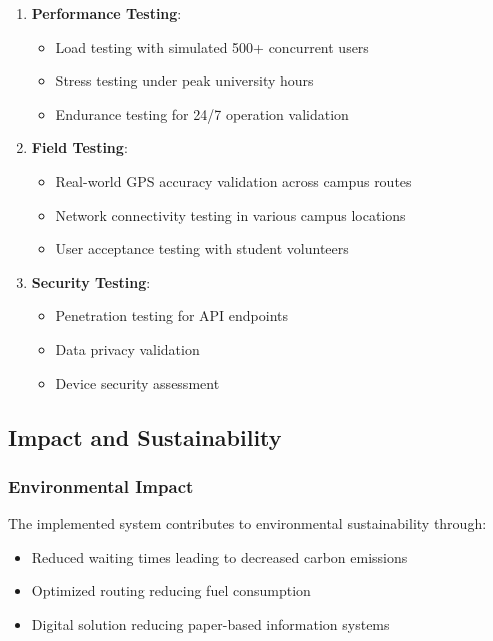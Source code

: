 \documentclass[12pt,a4paper]{article}
\begin{document}
\begin{enumerate}
    \item \textbf{Performance Testing}:
    \begin{itemize}
        \item Load testing with simulated 500+ concurrent users
        \item Stress testing under peak university hours
        \item Endurance testing for 24/7 operation validation
    \end{itemize}

    \item \textbf{Field Testing}:
    \begin{itemize}
        \item Real-world GPS accuracy validation across campus routes
        \item Network connectivity testing in various campus locations
        \item User acceptance testing with student volunteers
    \end{itemize}

    \item \textbf{Security Testing}:
    \begin{itemize}
        \item Penetration testing for API endpoints
        \item Data privacy validation
        \item Device security assessment
    \end{itemize}
\end{enumerate}

\subsection{Impact and Sustainability}

\subsubsection{Environmental Impact}

The implemented system contributes to environmental sustainability through:
\begin{itemize}
    \item Reduced waiting times leading to decreased carbon emissions
    \item Optimized routing reducing fuel consumption
    \item Digital solution reducing paper-based information systems
\end{itemize}
\end{document}
